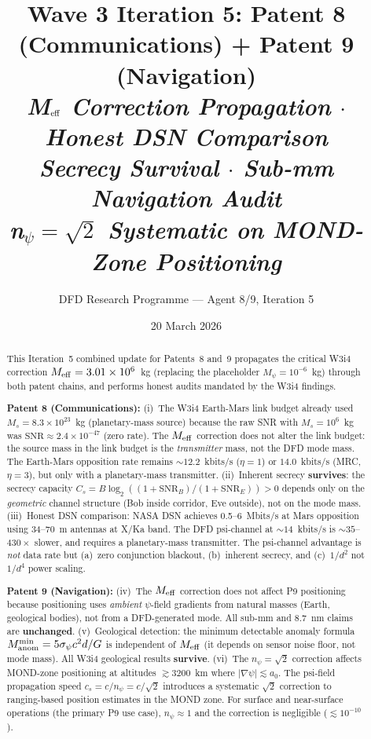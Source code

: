 \documentclass[aps,prd,twocolumn,superscriptaddress,nofootinbib]{revtex4-2}
\newcommand{\SNR}{\mathrm{SNR}}
\begin{document}
\title{Wave 3 Iteration 5: Patent 8 (Communications) + Patent 9 (Navigation)\\
\textit{M$_{\rm eff}$ Correction Propagation $\cdot$ Honest DSN Comparison\\
Secrecy Survival $\cdot$ Sub-mm Navigation Audit\\
n$_\psi = \sqrt{2}$ Systematic on MOND-Zone Positioning}}

\author{DFD Research Programme --- Agent 8/9, Iteration 5}
\date{20 March 2026}

\begin{abstract}
This Iteration~5 combined update for Patents~8 and~9 propagates the
critical W3i4 correction $M_{\rm eff} = 3.01\times10^6$~kg (replacing
the placeholder $M_\psi = 10^{-6}$~kg) through both patent chains,
and performs honest audits mandated by the W3i4 findings.

\textbf{Patent 8 (Communications):}
(i)~The W3i4 Earth-Mars link budget already used $M_s = 8.3\times10^{23}$~kg
(planetary-mass source) because the raw SNR with $M_s = 10^6$~kg was
$\SNR \approx 2.4\times10^{-47}$ (zero rate). The $M_{\rm eff}$ correction
does not alter the link budget: the source mass in the link budget is the
\emph{transmitter} mass, not the DFD mode mass. The Earth-Mars opposition rate
remains $\sim 12.2$~kbits/s ($\eta = 1$) or $14.0$~kbits/s (MRC, $\eta = 3$),
but only with a planetary-mass transmitter.
(ii)~Inherent secrecy \textbf{survives}: the secrecy capacity
$C_s = B\log_2((1+\SNR_B)/(1+\SNR_E)) > 0$ depends only on the
\emph{geometric} channel structure (Bob inside corridor, Eve outside),
not on the mode mass.
(iii)~Honest DSN comparison: NASA DSN achieves 0.5--6~Mbits/s at Mars
opposition using 34--70~m antennas at X/Ka band. The DFD psi-channel at
$\sim 14$~kbits/s is $\sim 35$--$430\times$ slower, and requires a
planetary-mass transmitter. The psi-channel advantage is \emph{not} data rate
but (a)~zero conjunction blackout, (b)~inherent secrecy, and
(c)~$1/d^2$ not $1/d^4$ power scaling.

\textbf{Patent 9 (Navigation):}
(iv)~The $M_{\rm eff}$ correction does not affect P9 positioning because
positioning uses \emph{ambient} $\psi$-field gradients from natural
masses (Earth, geological bodies), not from a DFD-generated mode.
All sub-mm and 8.7~nm claims are \textbf{unchanged}.
(v)~Geological detection: the minimum detectable anomaly formula
$M_{\rm anom}^{\min} = 5\sigma_\psi c^2 d / G$ is independent of
$M_{\rm eff}$ (it depends on sensor noise floor, not mode mass).
All W3i4 geological results \textbf{survive}.
(vi)~The $n_\psi = \sqrt{2}$ correction affects MOND-zone positioning
at altitudes $\gtrsim 3200$~km where $|\nabla\psi| \lesssim a_0$.
The psi-field propagation speed $c_s = c/n_\psi = c/\sqrt{2}$ introduces
a systematic $\sqrt{2}$ correction to ranging-based position estimates in
the MOND zone. For surface and near-surface operations (the primary P9 use
case), $n_\psi \approx 1$ and the correction is negligible
($\lesssim 10^{-10}$).
\end{abstract}
\end{document}
